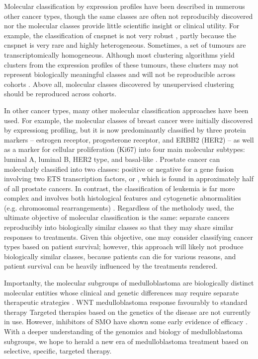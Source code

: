 Molecular classification by expression profiles have been described in numerous other cancer types, though the same classes are often not reproducibly discovered nor the molecular classes provide little scientific insight or clinical utility. For example, the classification of \gls{cnspnet} is not very robust , partly because the \gls{cnspnet} is very rare and highly heterogeneous. Sometimes, a set of tumours are transcriptomically homogeneous. Although most clustering algorithms yield clusters from the expression profiles of these tumours, these clusters may not represent biologically meaningful classes and will not be reproducible across cohorts . Above all, molecular classes discovered by unsupervised clustering should be reproduced across cohorts.

In other cancer types, many other molecular classification approaches have been used. For example, the molecular classes of breast cancer were initially discovered by expressiong profiling, but it is now predominantly classified by three protein markers -- estrogen receptor, progesterone receptor, and ERBB2 (HER2) -- as well as a marker for cellular proliferation (Ki67) into four main molecular subtypes: luminal A, luminal B, HER2 type, and basal-like . Prostate cancer can molecularly classified into two classes: positive or negative for a gene fusion involving two ETS transcription factors,  or  , which is found in approximately half of all prostate cancers. In contrast, the classification of leukemia is far more complex and involves both histological features and cytogenetic abnormalities (e.g. chromosomal rearrangements) . Regardless of the metholody used, the ultimate objective of molecular classification is the same: separate cancers reproducibly into biologically similar classes so that they may share similar responses to treatments. Given this objective, one may consider classifying cancer types based on patient survival; however, this approach will likely not produce biologically similar classes, because patients can die for various reasons, and patient survival can be heavily influenced by the treatments rendered.

Importanlty, the molecular subgroups of medulloblastoma are biologically distinct molecular entities whose clinical and genetic differences may require separate therapeutic strategies . WNT medulloblastoma response favourably to standard therapy  Targeted therapies based on the genetics of the disease are not currently in use. However, inhibitors of SMO have shown some early evidence of efficacy . With a deeper understanding of the genomics and biology of medulloblastoma subgroups, we hope to herald a new era of medulloblastoma treatment based on selective, specific, targeted therapy.

